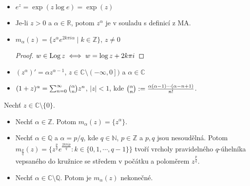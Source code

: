 \begin{properties}
\mbox{}
\vspace{-2em}
\begin{itemize}
    \item $e^z=\exp(z \log e)=\exp(z)$ 
    \item Je-li $z>0$ a $\alpha\in\mathbb{R}$, potom $z^{\alpha}$ je v souladu s definicí z MA.
    \item $m_{\alpha}(z)=\{z^{\alpha}e^{2k\pi i \alpha}\mid k\in\mathbb{Z}\}$, $z\neq 0$
    \begin{proof}$w\in \operatorname*{Log} z\iff w=\log z +2k\pi i$\end{proof}
    \item $(z^{\alpha})'=\alpha z^{\alpha-1}$, $z\in\mathbb{C}\setminus\left (-\infty,0\right ])$ a $\alpha\in\mathbb{C}$
    \item $(1+z)^{\alpha}=\sum_{n=0}^{\infty}\tbinom{\alpha}{n}z^{n} $, $\lvert z \rvert<1$, kde $\tbinom{\alpha}{n}:=\frac{\alpha(\alpha-1)\cdots(\alpha-n+1)}{n!}$.%
\end{itemize}
\end{properties}

\begin{observation}
Nechť $z \in\mathbb{C}\setminus\{0\}$.
\begin{itemize}
    \item Nechť $\alpha\in\mathbb{Z}$. Potom $m_{\alpha}(z)=\{z^{\alpha}\}$.%
    \item Nechť $\alpha\in\mathbb{Q}$ a $\alpha=p/q$, kde $q\in\mathbb{N}$, $p\in\mathbb{Z}$ a $p,q$ jsou nesoudělná. Potom $m_{\frac{p}{q}}(z)=\{z^{\frac{p}{q}}e^{\frac{2k\pi i p}{q}}: k\in\{0,1,\cdots,q-1\}\}$
    tvoří vrcholy pravidelného $q$-úhelníka vepsaného do kružnice se středem v počátku a poloměrem $z^{\frac{p}{q}}$. %
    \item Nechť $\alpha\in\mathbb{C}\setminus\mathbb{Q}$. Potom je $m_{\alpha}(z)$ nekonečné.%
\end{itemize}
\end{observation}


